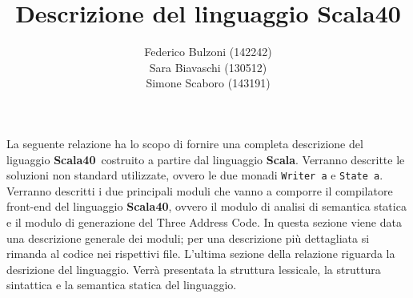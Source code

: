 \documentclass{article}
\title{Descrizione del linguaggio Scala40}
\date{}
\author{Federico Bulzoni (142242)\\
Sara Biavaschi (130512)\\
Simone Scaboro (143191)}
\newcommand{\SBF}{\textbf{Scala40}}
\begin{document}
    \maketitle
La seguente relazione ha lo scopo di fornire una completa descrizione del liguaggio \SBF\, costruito a partire dal linguaggio {\bf Scala}. Verranno descritte le soluzioni non standard utilizzate, ovvero le due monadi {\tt Writer a} e {\tt State a}. Verranno descritti i due principali moduli che vanno a comporre il compilatore front-end del linguaggio \SBF, ovvero il modulo di analisi di semantica statica e il modulo di generazione del Three Address Code. In questa sezione viene data una descrizione generale dei moduli; per una descrizione più dettagliata si rimanda al codice nei rispettivi file. L'ultima sezione della relazione riguarda la desrizione del linguaggio. Verrà presentata la struttura lessicale, la struttura sintattica e la semantica statica del linguaggio.



\end{document}
